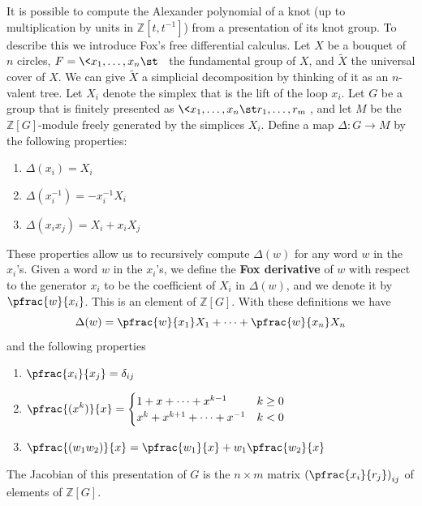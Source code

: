 It is possible to compute the Alexander polynomial of a knot (up to multiplication by units in $\mathbb Z[t,t^{-1}]$) from a presentation of its knot group. To describe this we introduce Fox's free differential calculus. Let $X$ be a bouquet of $n$ circles, $F = \< x_1,\ldots,x_n \st \ \>$ the fundamental group of $X$, and $\tilde X$ the universal cover of $X$. We can give $\tilde X$ a simplicial decomposition by thinking of it as an $n$-valent tree. Let $X_i$ denote the simplex that is the lift of the loop $x_i$. Let $G$ be a group that is finitely presented as $\< x_1,\ldots,x_n \st r_1,\ldots,r_m \>$, and let $M$ be the $\mathbb Z[G]$-module freely generated by the simplices $X_i$. Define a map $\Delta : G \rightarrow M$ by the following properties:
\begin{enumerate}
\item $\Delta(x_i) = X_i$
\item $\Delta(x_i^{-1}) = -x_i^{-1} X_i$
\item $\Delta(x_ix_j) = X_i + x_i X_j$
\end{enumerate}
These properties allow us to recursively compute $\Delta(w)$ for any word $w$ in the $x_i$'s. Given a word $w$ in the $x_i$'s, we define the \textbf{Fox derivative} of $w$ with respect to the generator $x_i$ to be the coefficient of $X_i$ in $\Delta(w)$, and we denote it by $\pfrac{w}{x_i}$. This is an element of $\mathbb Z[G]$. With these definitions we have
\[ \Delta(w) = \pfrac{w}{x_1} X_1 + \cdots + \pfrac{w}{x_n} X_n \]
and the following properties
\begin{enumerate}
\item $\displaystyle\pfrac{x_i}{x_j} = \delta_{ij}$
\item $\displaystyle\pfrac{(x^k)}{x} = \begin{cases} 1+x+\cdots+x^{k-1} & k \geq 0 \\ x^k+x^{k+1}+\cdots+x^{-1} & k<0 \end{cases}$
\item $\displaystyle\pfrac{(w_1w_2)}{x} = \pfrac{w_1}{x} + w_1 \pfrac{w_2}{x}$
\end{enumerate}
The Jacobian of this presentation of $G$ is the $n \times m$ matrix $\left( \pfrac{x_i}{r_j} \right)_{ij}$ of elements of $\mathbb Z[G]$. 

